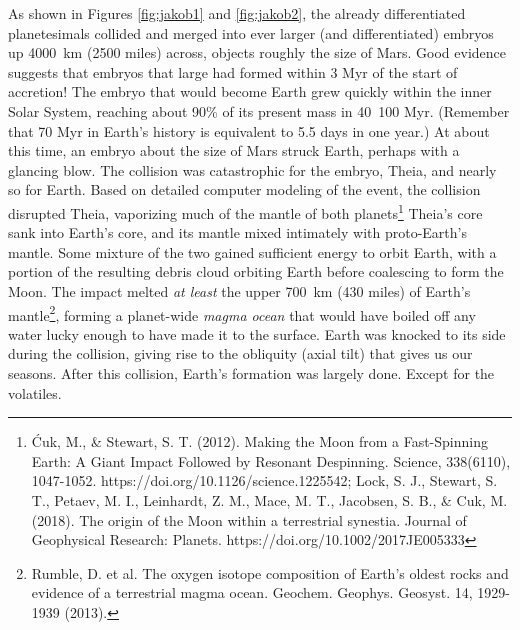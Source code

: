 As shown in Figures \ref{fig:jakob1} and \ref{fig:jakob2}, the already differentiated planetesimals collided and merged into ever larger (and differentiated) embryos up \SI{4000}{\kilo\metre} (2500 miles) across, objects roughly the size of Mars. Good evidence suggests that embryos that large had formed within 3 Myr of the start of accretion! The embryo that would become Earth grew quickly within the inner Solar System, reaching about 90\% of its present mass in \SI{40}{100}{} Myr. (Remember that 70 Myr in Earth's history is equivalent to 5.5 days in one year.) At about this time, an embryo about the size of Mars struck Earth, perhaps with a glancing blow. The collision was catastrophic for the embryo, Theia, and nearly so for Earth. Based on detailed computer modeling of the event, the collision disrupted Theia, vaporizing much of the mantle of both planets\footnote{\'{C}uk, M., \& Stewart, S. T. (2012). Making the Moon from a Fast-Spinning Earth: A Giant Impact Followed by Resonant Despinning. Science, 338(6110), 1047-1052. https://doi.org/10.1126/science.1225542; Lock, S. J., Stewart, S. T., Petaev, M. I., Leinhardt, Z. M., Mace, M. T., Jacobsen, S. B., \& Cuk, M. (2018). The origin of the Moon within a terrestrial synestia. Journal of Geophysical Research: Planets. https://doi.org/10.1002/2017JE005333
} Theia's core sank into Earth's core, and its mantle mixed intimately with proto-Earth's mantle. Some mixture of the two gained sufficient energy to orbit Earth, with a portion of the resulting debris cloud orbiting Earth before coalescing to form the Moon. The impact melted \textit{at least} the upper \SI{700}{\kilo\metre} (430 miles) of Earth's mantle\footnote{Rumble, D. et al. The oxygen isotope composition of Earth's oldest rocks and evidence of a terrestrial magma ocean. Geochem. Geophys. Geosyst. 14, 1929-1939 (2013).}, forming a planet-wide \emph{magma ocean} that would have boiled off any water lucky enough to have made it to the surface. Earth was knocked to its side during the collision, giving rise to the obliquity (axial tilt) that gives us our seasons. After this collision, Earth's formation was largely done. Except for the volatiles.\\

